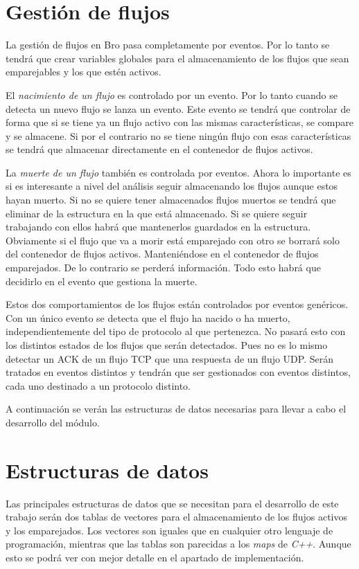 \section{Gestión de flujos}

La gestión de flujos en Bro pasa completamente por eventos. Por lo tanto se tendrá que crear variables globales 
para el almacenamiento de los flujos que sean emparejables y los que estén activos.

\intro El \textit{nacimiento de un flujo} es controlado por un evento. Por lo tanto cuando se detecta un nuevo 
flujo se lanza un evento. Este evento se tendrá que controlar de forma que si se tiene ya un flujo activo con las 
mismas características, se compare y se almacene. Si por el contrario no se tiene ningún flujo con esas 
características se tendrá que almacenar directamente en el contenedor de flujos activos.

\intro La \textit{muerte de un flujo} también es controlada por eventos. Ahora lo importante es si es interesante 
a nivel del análisis seguir almacenando los flujos aunque estos hayan muerto. Si no se quiere tener almacenados 
flujos muertos se tendrá que eliminar de la estructura en la que está almacenado. Si se quiere seguir trabajando 
con ellos habrá que mantenerlos guardados en la estructura. Obviamente si el flujo que va a morir está emparejado 
con otro se borrará solo del contenedor de flujos activos. Manteniéndose en el contenedor de flujos emparejados. De 
lo contrario se perderá información. Todo esto habrá que decidirlo en el evento que gestiona la muerte.

\intro Estos dos comportamientos de los flujos están controlados por eventos genéricos. Con un único evento se 
detecta que el flujo ha nacido o ha muerto, independientemente del tipo de protocolo al que pertenezca. No pasará 
esto con los distintos estados de los flujos que serán detectados. Pues no es lo mismo detectar un ACK de un flujo 
TCP que una respuesta de un flujo UDP. Serán tratados en eventos distintos y tendrán que ser gestionados con 
eventos distintos, cada uno destinado a un protocolo distinto. 

\intro A continuación se verán las estructuras de datos necesarias para llevar a cabo el desarrollo del módulo.

\section{Estructuras de datos}

Las principales estructuras de datos que se necesitan para el desarrollo de este trabajo serán dos tablas \cite{brotable} de 
vectores para el almacenamiento de los flujos activos y los emparejados. Los vectores son iguales que en cualquier 
otro lenguaje de programación, mientras que las tablas son parecidas a los \textit{maps} de \textit{C++}. Aunque 
esto se podrá ver con mejor detalle en el apartado de implementación.

